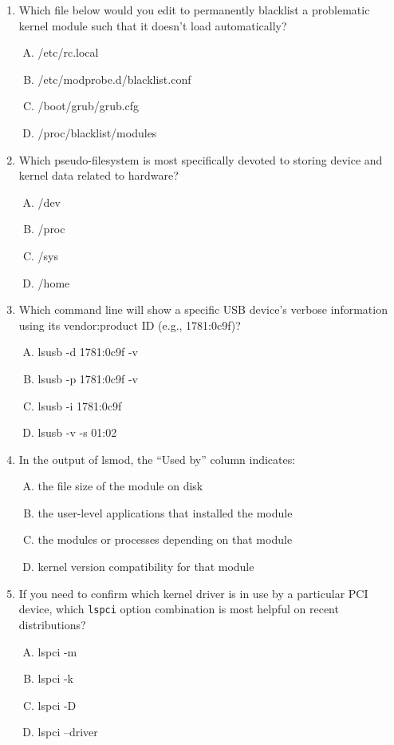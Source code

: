 \documentclass[a4paper]{report}
\begin{document}
\begin{enumerate}[1.]
\item Which file below would you edit to permanently blacklist a problematic kernel module such that it doesn’t load automatically?
  \begin{enumerate}[A)]
    \item /etc/rc.local
    \item /etc/modprobe.d/blacklist.conf
    \item /boot/grub/grub.cfg
    \item /proc/blacklist/modules
  \end{enumerate}

\item Which pseudo-filesystem is most specifically devoted to storing device and kernel data related to hardware?
  \begin{enumerate}[A)]
    \item /dev
    \item /proc
    \item /sys
    \item /home
  \end{enumerate}

\item Which command line will show a specific USB device’s verbose information using its vendor:product ID (e.g., 1781:0c9f)?
  \begin{enumerate}[A)]
    \item lsusb -d 1781:0c9f -v
    \item lsusb -p 1781:0c9f -v
    \item lsusb -i 1781:0c9f
    \item lsusb -v -s 01:02
  \end{enumerate}

\item In the output of lsmod, the “Used by” column indicates:
  \begin{enumerate}[A)]
    \item the file size of the module on disk
    \item the user-level applications that installed the module
    \item the modules or processes depending on that module
    \item kernel version compatibility for that module
  \end{enumerate}

\item If you need to confirm which kernel driver is in use by a particular PCI device, which \texttt{lspci} option combination is most helpful on recent distributions?
  \begin{enumerate}[A)]
    \item lspci -m
    \item lspci -k
    \item lspci -D
    \item lspci --driver
  \end{enumerate}


\end{enumerate}
\end{document}
